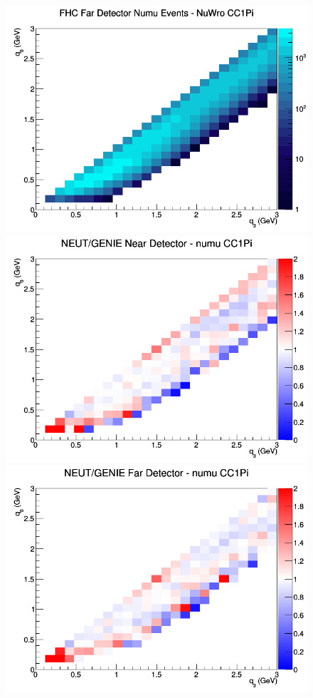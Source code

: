 \documentclass[12pt]{article}
\begin{document}
\begin{figure}[h]
\endminipage
{}
\includegraphics[width=\linewidth]{q0_q3/nominal/CC1Pi_FHC_FD_numu_q3_q0_NuWro.png}
\endminipage
\newline
{}
\includegraphics[width=\linewidth]{q0_q3/nominal/ratios/CC1Pi_NEUT_GENIE_numu_near_q3_q0.png}
\endminipage
{}
\includegraphics[width=\linewidth]{q0_q3/nominal/ratios/CC1Pi_NEUT_GENIE_numu_far_q3_q0.png}

\end{figure}
\end{document}
